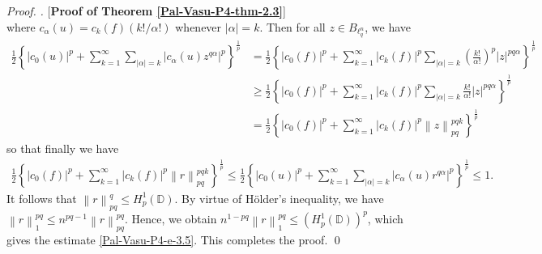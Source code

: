 \documentclass[a4paper,12pt]{amsart}
\theoremstyle{definition}
\newenvironment{pf}[1][]{%
 \vskip 3mm
 \noindent
 \ifthenelse{\equal{#1}{}}%
  {{\slshape Proof. }}%
  {{\slshape #1.} }%
 }%
{\qed\bigskip}
\newcommand{\norm}[1]{\left\lVert#1\right\rVert}
\begin{document}
\begin{pf} [{\bf Proof of Theorem \ref{Pal-Vasu-P4-thm-2.3}}]
\begin{equation*}
	\end{equation*}
	where $c_{\alpha}(u)=c_k(f)(k!/\alpha!)$ whenever $|\alpha|=k$. Then for all $z\in B_{\ell^n_q}$, we have
	\begin{align*}
		\frac{1}{2}\left\{|c_0(u)|^p + \sum_{k=1}^{\infty}\sum_{|\alpha|=k}|c_{\alpha}(u)z^{q\alpha}|^p\right\}^{\frac{1}{p}} &= \frac{1}{2}\left\{|c_0(f)|^p+\sum_{k=1}^{\infty}|c_{k}(f)|^p\sum_{|\alpha|=k}\left(\frac{k!}{\alpha!}\right)^p|z|^{pq\alpha}\right\}^{\frac{1}{p}}\\& \geq 
		\frac{1}{2}\left\{|c_0(f)|^p+\sum_{k=1}^{\infty}|c_{k}(f)|^p\sum_{|\alpha|=k}\frac{k!}{\alpha!}|z|^{pq\alpha}\right\}^{\frac{1}{p}}\\ & = 
		\frac{1}{2}\left\{|c_0(f)|^p+\sum_{k=1}^{\infty}|c_{k}(f)|^p\norm{z}^{pqk}_{pq}\right\}^{\frac{1}{p}}
	\end{align*}
	so that finally we have 
	\begin{align*}
		\frac{1}{2}\left\{|c_0(f)|^p+\sum_{k=1}^{\infty}|c_{k}(f)|^p\norm{r}^{pqk}_{pq}\right\}^{\frac{1}{p}}\leq \frac{1}{2}\left\{|c_0(u)|^p + \sum_{k=1}^{\infty}\sum_{|\alpha|=k}|c_{\alpha}(u)r^{q\alpha}|^p\right\}^{\frac{1}{p}}\leq 1. 
	\end{align*}
	It follows that $\norm{r}^q_{pq}\leq H^1_{p}(\mathbb{D})$. By virtue of H\"{o}lder's inequality, we have $\norm{r}^{pq}_{1}\leq n^{pq-1}\norm{r}^{pq}_{pq}$. Hence, we obtain $n^{1-pq}\norm{r}^{pq}_{1}\leq (H^1_{p}(\mathbb{D}))^p$, which gives the estimate \eqref{Pal-Vasu-P4-e-3.5}. This completes the proof. 
\end{pf}
\end{document}

